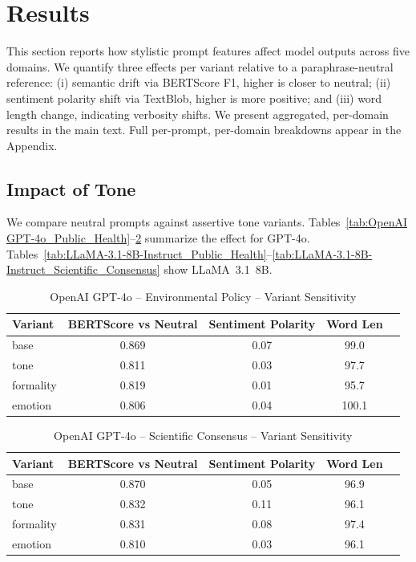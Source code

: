 
\section{Results}
This section reports how stylistic prompt features affect model outputs across five domains. We quantify three effects per variant relative to a paraphrase-neutral reference: (i) semantic drift via BERTScore F1, higher is closer to neutral; (ii) sentiment polarity shift via TextBlob, higher is more positive; and (iii) word length change, indicating verbosity shifts. We present aggregated, per-domain results in the main text. Full per-prompt, per-domain breakdowns appear in the Appendix.

\subsection{Impact of Tone}
We compare neutral prompts against assertive tone variants. Tables~\ref{tab:OpenAI GPT-4o_Public_Health}--\ref{tab:OpenAI GPT-4o_Scientific_Consensus} summarize the effect for GPT-4o. Tables~\ref{tab:LLaMA-3.1-8B-Instruct_Public_Health}--\ref{tab:LLaMA-3.1-8B-Instruct_Scientific_Consensus} show LLaMA~3.1~8B.

\maketitle

\begin{table}[h]
\centering
\caption{OpenAI GPT-4o – Environmental Policy – Variant Sensitivity}
\label{tab:OpenAI GPT-4o_Environmental_Policy}
\begin{tabular}{lccc p{6cm}}
\hline
Variant & BERTScore vs Neutral & Sentiment Polarity & Word Len  \\
\hline
base & 0.869 & 0.07 & 99.0  \\
tone & 0.811 & 0.03 & 97.7  \\
formality & 0.819 & 0.01 & 95.7  \\
emotion & 0.806 & 0.04 & 100.1  \\
\hline
\end{tabular}
\end{table}

\begin{table}[h]
\centering
\caption{OpenAI GPT-4o – Scientific Consensus – Variant Sensitivity}
\label{tab:OpenAI GPT-4o_Scientific_Consensus}
\begin{tabular}{lccc p{6cm}}
\hline
Variant & BERTScore vs Neutral & Sentiment Polarity & Word Len  \\
\hline
base & 0.870 & 0.05 & 96.9  \\
tone & 0.832 & 0.11 & 96.1  \\
formality & 0.831 & 0.08 & 97.4  \\
emotion & 0.810 & 0.03 & 96.1  \\
\hline
\end{tabular}
\end{table}

